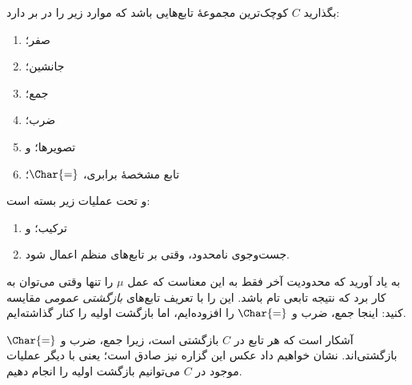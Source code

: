 \documentclass[../../../include/open-logic-section]{subfiles}
\begin{document}

بگذارید $C$ کوچک‌ترین مجموعهٔ تابع‌هایی باشد که موارد زیر را در بر دارد:
\begin{enumerate}
\item صفر؛
\item جانشین؛
\item جمع؛
\item ضرب؛
\item تصویرها؛ و
\item تابع مشخصهٔ برابری، $\Char{=}$؛
\end{enumerate}
و تحت عملیات زیر بسته است:
\begin{enumerate}
\item ترکیب؛ و
\item جست‌وجوی نامحدود، وقتی بر تابع‌های منظم اعمال شود.
\end{enumerate}
به یاد آورید که محدودیت آخر فقط به این معناست که عمل $\mu$ را تنها
وقتی می‌توان به کار برد که نتیجه تابعی تام باشد. این را با تعریف
تابع‌های \emph{بازگشتی عمومی} مقایسه کنید: اینجا جمع، ضرب و
$\Char{=}$ را افزوده‌ایم، اما بازگشت اولیه را کنار گذاشته‌ایم.

آشکار است که هر تابع در $C$ بازگشتی است، زیرا جمع، ضرب و $\Char{=}$
بازگشتی‌اند. نشان خواهیم داد عکس این گزاره نیز صادق است؛ یعنی با دیگر
عملیات موجود در $C$ می‌توانیم بازگشت اولیه را انجام دهیم.
\end{document}
